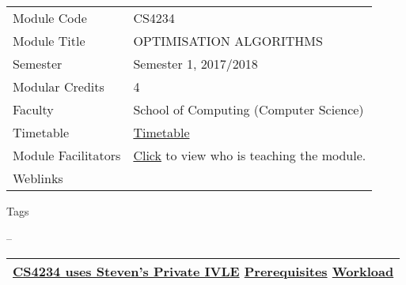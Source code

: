 \hypertarget{ctl00_ctl00_ContentPlaceHolder1_ContentPlaceHolder1_LV_itemPlaceholderContainer}{}
\begin{longtable}[]{@{}ll@{}}
\toprule
\protect\hypertarget{ctl00_ctl00_ContentPlaceHolder1_ContentPlaceHolder1_LV_ctrl0_txtCode}{}{Module
Code} &
\protect\hypertarget{ctl00_ctl00_ContentPlaceHolder1_ContentPlaceHolder1_LV_ctrl0_lcCode}{}{CS4234}\tabularnewline
\protect\hypertarget{ctl00_ctl00_ContentPlaceHolder1_ContentPlaceHolder1_LV_ctrl0_lcCourse}{}{Module
Title} &
\protect\hypertarget{ctl00_ctl00_ContentPlaceHolder1_ContentPlaceHolder1_LV_ctrl0_lcCourseName}{}{OPTIMISATION
ALGORITHMS}\tabularnewline
\protect\hypertarget{ctl00_ctl00_ContentPlaceHolder1_ContentPlaceHolder1_LV_ctrl0_lcSemester}{}{Semester}
&
\protect\hypertarget{ctl00_ctl00_ContentPlaceHolder1_ContentPlaceHolder1_LV_ctrl0_lcSem}{}{Semester
1, 2017/2018}\tabularnewline
\protect\hypertarget{ctl00_ctl00_ContentPlaceHolder1_ContentPlaceHolder1_LV_ctrl0_lcModCredit}{}{Modular
Credits} &
\protect\hypertarget{ctl00_ctl00_ContentPlaceHolder1_ContentPlaceHolder1_LV_ctrl0_lcModC}{}{4}\tabularnewline
\protect\hypertarget{ctl00_ctl00_ContentPlaceHolder1_ContentPlaceHolder1_LV_ctrl0_lcFaculty}{}{Faculty}
&
\protect\hypertarget{ctl00_ctl00_ContentPlaceHolder1_ContentPlaceHolder1_LV_ctrl0_lcFac}{}{School
of Computing (Computer Science)}\tabularnewline
\protect\hypertarget{ctl00_ctl00_ContentPlaceHolder1_ContentPlaceHolder1_LV_ctrl0_Label1}{}{Timetable}
&
\protect\hypertarget{ctl00_ctl00_ContentPlaceHolder1_ContentPlaceHolder1_LV_ctrl0_Span1}{}{\href{javascript:void(0);}{Timetable}}\tabularnewline
\protect\hypertarget{ctl00_ctl00_ContentPlaceHolder1_ContentPlaceHolder1_LV_ctrl0_Label6}{}{Module
Facilitators} &
\protect\hypertarget{ctl00_ctl00_ContentPlaceHolder1_ContentPlaceHolder1_LV_ctrl0_Span2}{}{\href{list_lecturers.aspx?CourseID=a06428b2-fbf7-43f1-a04a-7edd20cd8b63\&ClickFrom=}{Click}
to view who is teaching the module.}\tabularnewline
\protect\hypertarget{ctl00_ctl00_ContentPlaceHolder1_ContentPlaceHolder1_LV_ctrl0_LabelCtrl1}{}{Weblinks}
&\tabularnewline
\bottomrule
\end{longtable}

\protect\hypertarget{ctl00_ctl00_ContentPlaceHolder1_ContentPlaceHolder1_LV_ctrl0_Label4}{}{Tags}

\protect\hypertarget{ctl00_ctl00_ContentPlaceHolder1_ContentPlaceHolder1_LV_ctrl0_lblTags}{}{--}

\begin{longtable}[]{@{}l@{}}
\toprule
\protect\hypertarget{ctl00_ctl00_ContentPlaceHolder1_ContentPlaceHolder1_lblSectionMiddle}{}{\protect\hyperlink{CS4234ux5cux2520usesux5cux2520Steven}{CS4234
uses Steven's Private IVLE} \textbar{}
\protect\hyperlink{Prerequisites}{Prerequisites} \textbar{}
\protect\hyperlink{Workload}{Workload}}\tabularnewline
\bottomrule
\end{longtable}

